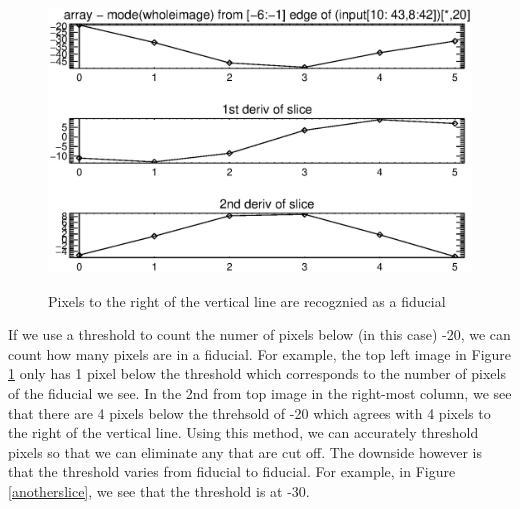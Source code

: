 \documentclass[10pt]{article}
\begin{document}
\begin{figure}[!ht]
{        \includegraphics[width=0.5\linewidth, height = .34\textheight, keepaspectratio=true]{plots_tables_images/betterslice5.eps}
        }
        \caption{Pixels to the right of the vertical line are recogznied as a fiducial}
        \label{betterslice}
\end{figure}

If we use a threshold to count the numer of pixels below (in this case) -20, we can count how many pixels are in a fiducial. For example, the top left image in Figure \ref{betterslice} only has 1 pixel below the threshold which corresponds to the number of pixels of the fiducial we see. In the 2nd from top image in the right-most column, we see that there are 4 pixels below the threhsold of -20 which agrees with 4 pixels to the right of the vertical line. Using this method, we can accurately threshold pixels so that we can eliminate any that are cut off. The downside however is that the threshold varies from fiducial to fiducial. For example, in Figure \ref{anotherslice}, we see that the threshold is at -30.
\end{document}
